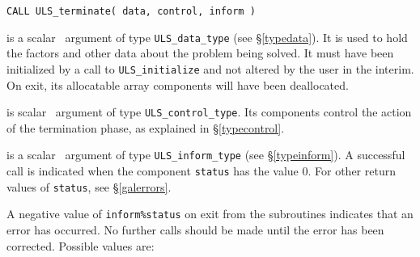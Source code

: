 \documentclass{galahad}
\newcommand{\packagename}{ULS}
\begin{document}
\hskip0.5in
{\tt CALL \packagename\_terminate( data, control, inform )}

\begin{description}

 is a scalar \intentinout\ argument of type
{\tt \packagename\_data\_type}
(see \S\ref{typedata}). It is used to hold the factors and other
data about the problem being solved.
It must have been initialized by a call to
{\tt \packagename\_ini\-tialize} and not altered by the user in the interim.
On exit, its allocatable array components will have been deallocated.

 is scalar \intentin\ argument of type
{\tt \packagename\_control\_type}. Its components control the action
of the termination phase, as explained in
\S\ref{typecontrol}.

 is a scalar \intentinout\ argument of type
{\tt \packagename\_inform\_type}
(see \S\ref{typeinform}).
A successful call is indicated when the  component {\tt status} has the value 0.
For other return values of {\tt status}, see \S\ref{galerrors}.

\end{description}


\galerrors
A negative value of {\tt inform\%status} on exit from the subroutines
indicates that an error has occurred. No further calls should be made
until the error has been corrected. Possible values are:
\end{document}
